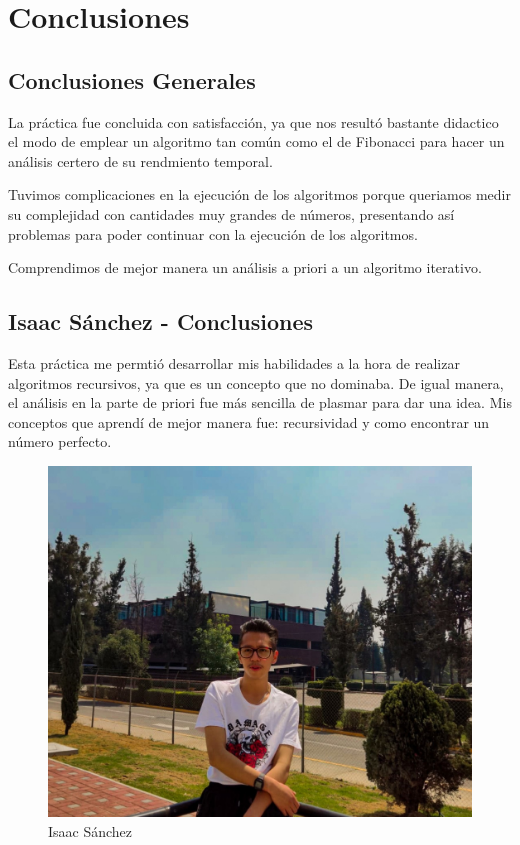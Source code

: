 \chapter{Conclusiones}

\section{Conclusiones Generales}
    
    La práctica fue concluida con satisfacción, ya que nos resultó bastante didactico el modo de emplear un algoritmo tan común como el de Fibonacci para hacer un análisis certero de su rendmiento temporal. 
    
    Tuvimos complicaciones en la ejecución de los algoritmos porque queriamos medir su complejidad con cantidades muy grandes de números, presentando así problemas para poder continuar con la ejecución de los algoritmos.
    
    Comprendimos de mejor manera un análisis a priori a un algoritmo iterativo. 

\newpage
\section{Isaac Sánchez - Conclusiones}
    Esta práctica me permtió desarrollar mis habilidades a la hora de realizar algoritmos recursivos, ya que es un concepto que no dominaba. De igual manera, el análisis en la parte de priori fue más sencilla de plasmar para dar una idea. Mis conceptos que aprendí de mejor manera fue: recursividad y como encontrar un número perfecto.
    \begin{figure}[htp!]
            \centering
            \includegraphics[width=1 \textwidth]{Images/Fotos_Alumnos/274612600_2528992867236334_6677874837890685705_n.jpg}  
            \caption{Isaac Sánchez}
            \label{fig:my_label1}
        \end{figure}
    


